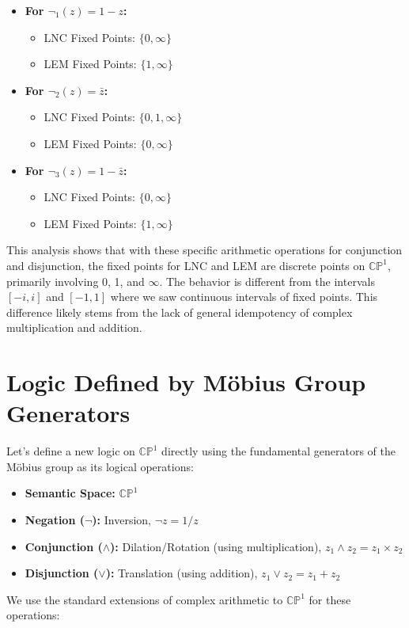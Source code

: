 \documentclass{article}
\begin{document}
	\begin{itemize}
		\item \textbf{For $\neg_1(z) = 1 - z$:}
		\begin{itemize}
			\item LNC Fixed Points: $\{0, \infty\}$
			\item LEM Fixed Points: $\{1, \infty\}$
		\end{itemize}
		
		\item \textbf{For $\neg_2(z) = \bar{z}$:}
		\begin{itemize}
			\item LNC Fixed Points: $\{0, 1, \infty\}$
			\item LEM Fixed Points: $\{0, \infty\}$
		\end{itemize}
		
		\item \textbf{For $\neg_3(z) = 1 - \bar{z}$:}
		\begin{itemize}
			\item LNC Fixed Points: $\{0, \infty\}$
			\item LEM Fixed Points: $\{1, \infty\}$
		\end{itemize}
	\end{itemize}
	This analysis shows that with these specific arithmetic operations for conjunction and disjunction, the fixed points for LNC and LEM are discrete points on $\mathbb{CP}^1$, primarily involving 0, 1, and $\infty$. The behavior is different from the intervals $[-i, i]$ and $[-1, 1]$ where we saw continuous intervals of fixed points. This difference likely stems from the lack of general idempotency of complex multiplication and addition.
	
	\section{Logic Defined by M\"{o}bius Group Generators}
	
	Let's define a new logic on $\mathbb{CP}^1$ directly using the fundamental generators of the M\"{o}bius group as its logical operations:
	
	\begin{itemize}
		\item \textbf{Semantic Space:} $\mathbb{CP}^1$
		
		\item \textbf{Negation ($\neg$):} Inversion, $\neg z = 1/z$
		
		\item \textbf{Conjunction ($\wedge$):} Dilation/Rotation (using multiplication), $z_1 \wedge z_2 = z_1 \times z_2$
		
		\item \textbf{Disjunction ($\vee$):} Translation (using addition), $z_1 \vee z_2 = z_1 + z_2$
	\end{itemize}
	We use the standard extensions of complex arithmetic to $\mathbb{CP}^1$ for these operations:
	
\end{document}
